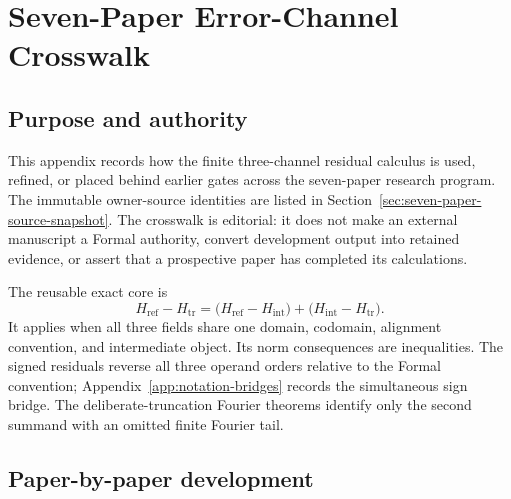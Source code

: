 \chapter{Seven-Paper Error-Channel Crosswalk}
\label{app:seven-paper-error-channel-crosswalk}
\small
\sloppy
{}

\section{Purpose and authority}

This appendix records how the finite three-channel residual calculus is used, refined,
or placed behind earlier gates across the seven-paper research program.  The immutable
owner-source identities are listed in
Section~\ref{sec:seven-paper-source-snapshot}.  The crosswalk is editorial: it does not
make an external manuscript a Formal authority, convert development output into retained
evidence, or assert that a prospective paper has completed its calculations.

The reusable exact core is
\[
  H_{\mathrm{ref}}-H_{\mathrm{tr}}
  =
  \bigl(H_{\mathrm{ref}}-H_{\mathrm{int}}\bigr)
  +
  \bigl(H_{\mathrm{int}}-H_{\mathrm{tr}}\bigr).
\]
It applies when all three fields share one domain, codomain, alignment convention, and
intermediate object.  Its norm consequences are inequalities.  The signed
 residuals reverse all three operand orders relative to the Formal
convention; Appendix~\ref{app:notation-bridges} records the simultaneous sign bridge.
The deliberate-truncation Fourier theorems identify only the second summand with an
omitted finite Fourier tail.

\section{Paper-by-paper development}

